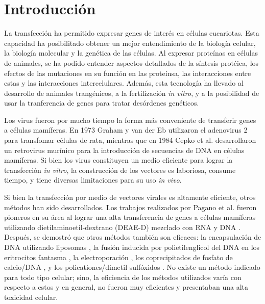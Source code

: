 \documentclass[fleqn,10pt]{SelfArx} %
\affiliation{\textsuperscript{1}\textit{Facultad de Ciencias Biológicas, Universidad Ricardo Palma, Lima, Peru}} %
\affiliation{*\textbf{Correspondencia}: jmanuel9112@icloud.com / giancuneo@gmail.com } %
\begin{document}
\flushbottom %

\maketitle %

\tableofcontents %

\thispagestyle{empty} %


\section{Introducción} 

La transfección ha permitido  expresar genes de interés en células eucariotas. Esta capacidad ha posibilitado obtener un mejor entendimiento de la biología celular, la biología molecular y la genética de las células. Al expresar proteínas en células de animales, se ha podido entender aspectos detallados de la síntesis protéica,  los efectos de las mutaciones en su función en las proteínsa, las interacciones entre estas y las interacciones intercelulares. Además, esta tecnología ha llevado al desarrollo de animales trangénicos, a la fertilización \textit{in vitro}, y a la posibilidad de usar la tranferencia de genes para tratar desórdenes genéticos.

Los virus fueron por mucho tiempo la forma más conveniente de transferir genes a células mamíferas. En 1973 Graham y van der Eb \cite{Graham:1973aa} utilizaron el adenovirus 2 para transfomar células de rata, mientras que en 1984 Cepko et al. \cite{Cepko:1984aa} desarrollaron un retrovirus murínico para la introducción de secuencias de DNA en células mamíferas. Si bien los virus constituyen un medio eficiente para lograr la transfección \textit{in vitro}, la construcción de los vectores es laboriosa, consume tiempo, y tiene diversas limitaciones para su uso \textit{in vivo}.

Si bien la transfección por medio de vectores virales es altamente eficiente, otros métodos han sido desarrollados. Los trabajos realizados por Pagano et al. \cite{Pagano:1967aa} fueron pioneros en su área al lograr una alta transferencia de genes a células mamíferas utilizando dietilaminoetil-dextrano (DEAE-D) mezclado con RNA y DNA  \cite{McCutchan:1968aa, Pagano:1967aa}. Después, se demostró que otros métodos también son eficaces: la encapsulación de DNA utilizando liposomas \cite{Fraley:1980aa, Wong:1980aa, Straubinger:1983aa, Fraley:1981aa}, la fusión inducida por polietilenglicol del DNA en los eritrocitos fantasma \cite{Straus:1980aa}, la electroporación \cite{Neumann:1982aa}, los coprecipitados de fosfato de calcio/DNA \cite{Wigler:1979aa}, y los policationes/dimetil sulfóxidos \cite{Kawai:1984aa}. No existe un método indicado para todo tipo celular; sino, la eficiencia de los métodos utilizados varía con respecto a estos y en general, no fueron muy eficientes y presentaban una alta toxicidad celular.
\end{document}
